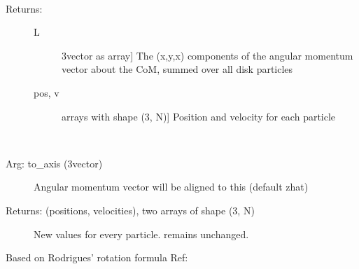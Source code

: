 \documentclass[letterpaper,10pt,english]{sphinxmanual}
\begin{document}
\begin{fulllineitems}
\begin{fulllineitems}
\begin{description}
\end{description}

\end{fulllineitems}


\begin{fulllineitems}
\label{\detokenize{centerofmass:galaxy.centerofmass.CenterOfMass.angular_momentum}}~\begin{description}
\item[{Returns: }] \leavevmode\begin{description}
\item[{L}] \leavevmode{[}3\sphinxhyphen{}vector as array{]}
The (x,y,x) components of the angular momentum vector about the CoM,
summed over all disk particles

\item[{pos, v}] \leavevmode{[}arrays with shape (3, N){]}
Position and velocity for each particle

\end{description}

\end{description}

\end{fulllineitems}


\begin{fulllineitems}
\label{\detokenize{centerofmass:galaxy.centerofmass.CenterOfMass.rotate_frame}}~\begin{description}
\item[{Arg: to\_axis (3\sphinxhyphen{}vector)}] \leavevmode
Angular momentum vector will be aligned to this (default z\sphinxhyphen{}hat)

\item[{Returns: (positions, velocities), two arrays of shape (3, N)}] \leavevmode
New values for every particle.  remains unchanged.

\end{description}

Based on Rodrigues’ rotation formula
Ref: 

\end{fulllineitems}


\end{fulllineitems}
\end{document}
